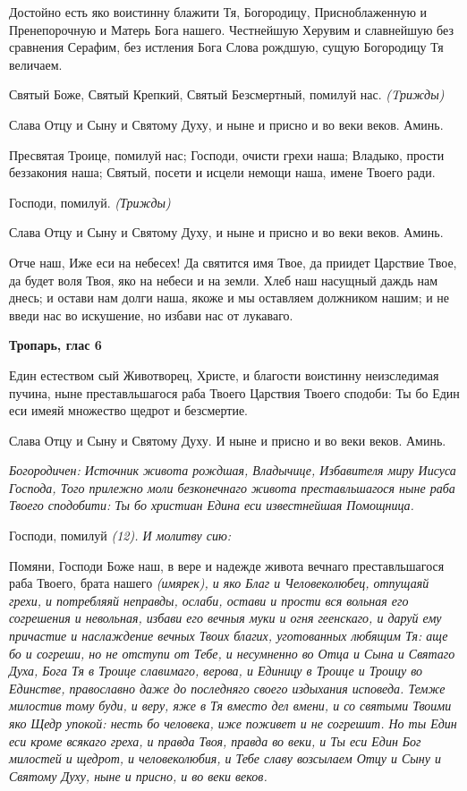    Достойно есть яко воистинну блажити Тя, Богородицу, Присноблаженную и
Пренепорочную и Матерь Бога нашего. Честнейшую Херувим и славнейшую
без сравнения Серафим, без истления Бога Слова рождшую, сущую
Богородицу Тя величаем.


   Святый Боже, Святый Крепкий, Святый Безсмертный, помилуй нас. \itshape 
(Tрижды)\normalfont{}


   Слава Отцу и Сыну и Святому Духу, и ныне и присно и во веки веков.
Аминь.


   Пресвятая Троице, помилуй нас; Господи, очисти грехи наша; Владыко,
прости беззакония наша; Святый, посети и исцели немощи наша, имене
Твоего ради.



   Господи, помилуй. \itshape  (Трижды)\normalfont{}


   Слава Отцу и Сыну и Святому Духу, и ныне и присно и во веки веков.
Аминь.


   Отче наш, Иже еси на небесех! Да святится имя Твое, да приидет
Царствие Твое, да будет воля Твоя, яко на небеси и на земли. Хлеб наш
насущный даждь нам днесь; и остави нам долги наша, якоже и мы оставляем
должником нашим; и не введи нас во искушение, но избави нас от
лукаваго.



 

\bfseries Тропарь, глас 6\normalfont{}


   Един естеством сый Животворец, Христе, и благости воистинну
неизследимая пучина, ныне преставльшагося раба Твоего Царствия Твоего
сподоби: Ты бо Един еси имеяй множество щедрот и безсмертие.


   Слава Отцу и Сыну и Святому Духу. И ныне и присно и во веки веков.
Аминь.


 \itshape Богородичен:\normalfont{} Источник живота рождшая, Владычице, Избавителя миру
Иисуса Господа, Того прилежно моли безконечнаго живота преставльшагося
ныне раба Твоего сподобити: Ты бо христиан Едина еси известнейшая
Помощница.


   Господи, помилуй \itshape (12). И молитву сию:\normalfont{}


   Помяни, Господи Боже наш, в вере и надежде живота вечнаго
преставльшагося раба Твоего, брата нашего \itshape (имярек)\normalfont{}, и яко Благ и
Человеколюбец, отпущаяй грехи, и потребляяй неправды, ослаби, остави и
прости вся вольная его согрешения и невольная, избави его вечныя муки и
огня геенскаго, и даруй ему причастие и наслаждение вечных Твоих благих,
уготованных любящим Тя: аще бо и согреши, но не отступи от Тебе, и
несумненно во Отца и Сына и Святаго Духа, Бога Тя в Троице славимаго,
верова, и Единицу в Троице и Троицу во Единстве, православно даже
до последняго своего издыхания исповеда. Темже милостив тому
буди, и веру, яже в Тя вместо дел вмени, и со святыми Твоими яко
Щедр упокой: несть бо человека, иже поживет и не согрешит. Но ты
Един еси кроме всякаго греха, и правда Твоя, правда во веки, и Ты
еси Един Бог милостей и щедрот, и человеколюбия, и Тебе славу
возсылаем Отцу и Сыну и Святому Духу, ныне и присно, и во веки
веков.

   


\mychapterending
